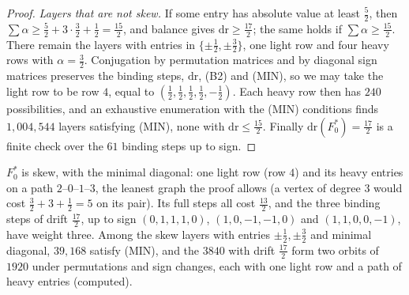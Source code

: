 \documentclass[11pt]{amsart}
\theoremstyle{definition}
\theoremstyle{plain}
\begin{document}
\begin{proof}
\emph{Layers that are not skew.} If some entry has absolute value at least $\frac52$, then $\sum\alpha\ge\frac52+3\cdot\frac32+\frac12=\frac{15}2$, and balance gives $\mathrm{dr}\ge\frac{17}2$; the same holds if $\sum\alpha\ge\frac{15}2$. There remain the layers with entries in $\{\pm\frac12,\pm\frac32\}$, one light row and four heavy rows with $\alpha=\frac32$. Conjugation by permutation matrices and by diagonal sign matrices preserves the binding steps, $\mathrm{dr}$, (B2) and (MIN), so we may take the light row to be row $4$, equal to $(\frac12,\frac12,\frac12,\frac12,-\frac12)$. Each heavy row then has $240$ possibilities, and an exhaustive enumeration with the (MIN) conditions finds $1{,}004{,}544$ layers satisfying (MIN), none with $\mathrm{dr}\le\frac{15}2$. Finally $\mathrm{dr}(F_0^*)=\frac{17}2$ is a finite check over the $61$ binding steps up to sign.
\end{proof}

$F_0^*$ is skew, with the minimal diagonal: one light row (row $4$) and its heavy entries on a path $2$--$0$--$1$--$3$, the leanest graph the proof allows (a vertex of degree $3$ would cost $\frac32+3+\frac12=5$ on its pair). Its full steps all cost $\frac{13}2$, and the three binding steps of drift $\frac{17}2$, up to sign $(0,1,1,1,0)$, $(1,0,-1,-1,0)$ and $(1,1,0,0,-1)$, have weight three. Among the skew layers with entries $\pm\frac12,\pm\frac32$ and minimal diagonal, $39{,}168$ satisfy (MIN), and the $3840$ with drift $\frac{17}2$ form two orbits of $1920$ under permutations and sign changes, each with one light row and a path of heavy entries (computed).
\end{document}
